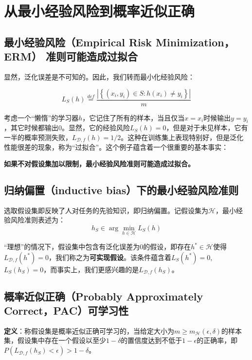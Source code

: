 \documentclass{article}
\begin{document}
\section{从最小经验风险到概率近似正确}

\subsection{最小经验风险（Empirical Risk Minimization，ERM） 准则可能造成过拟合}

	显然，泛化误差是不可知的。因此，我们转而最小化经验风险：

	\begin{equation}
	L_S(h)\overset{def}{=}\frac{|\left\{(x_i,y_i)\in S:h(x_i)\neq y_i \right\}|}{m}
	\end{equation}

	考虑一个“懒惰”的学习器$h$，它记住了所有的样本，当且仅当$x=x_i$时候输出$y=y_i$，其它时候都输出0。显然，它的经验风险$L_S(h)=0$，但是对于未见样本，它有一半的概率预测失败，$L_{\mathcal{D},f}(h)=1/2$。这种在训练集上表现特别好，但是泛化性能很差的现象，称为“过拟合”。这个例子蕴含着一个很重要的基本事实：
	
	\textbf{如果不对假设集加以限制，最小经验风险准则可能造成过拟合。}

\subsection{归纳偏置（inductive bias）下的最小经验风险准则}

	选取假设集即反映了人对任务的先验知识，即归纳偏置。记假设集为$\mathcal{H}$，最小经验风险准则表述为：
	\begin{equation}
	h_S\in \arg\min \limits_{h\in\mathcal{H}}L_S(h)
	\end{equation}

	“理想”的情况下，假设集中包含有泛化误差为0的假设，即存在$h^*\in\mathcal{H}$使得$L_{\mathcal{D},f}(h^*) = 0$，我们称之为\textbf{可实现假设}。该条件蕴含着$L_S(h^*)=0$, $L_S(h_S)=0$，而事实上，我们更感兴趣的是$L_{\mathcal{D},f}(h_S)$。

\subsection{概率近似正确（Probably Approximately Correct，PAC）可学习性}
\noindent\textbf{定义}：称假设集是概率近似正确可学习的，当给定大小为$m\geq m_\mathcal{H}(\epsilon,\delta)$的样本集，假设集中存在一个假设以至少$1-\delta$的置信度达到不低于$1-\epsilon$的正确率，即$P(L_{\mathcal{D},f}(h_S) < \epsilon) > 1-\delta$。
	
\end{document}
